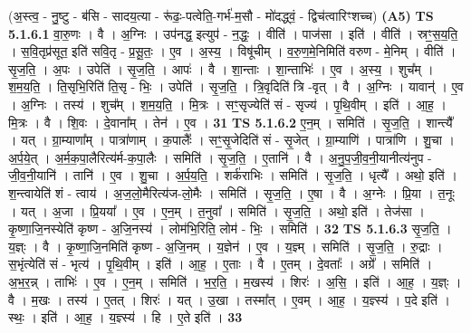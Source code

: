 \documentclass[17pt]{extarticle}
\begin{document}
                  \newline
                      (अ॒स्त्व॒ - नु॒ष्टु - ब॑सि - सादय॒त्या - रू॑ढः॒-पत्वेति॒-गर्भ॑-म॒सौ - मो॑दद्ध्वं॒ - द्विच॑त्वारिꣳशच्च)  \textbf{(A5)} \newline \newline
                                \textbf{ TS 5.1.6.1} \newline
                  वा॒रु॒णः । वै । अ॒ग्निः । उप॑नद्ध॒ इत्युप॑ - न॒द्धः॒ । वीति॑ । पाज॑सा । इति॑ । वीति॑ । स्रꣳ॒॒स॒य॒ति॒ । स॒वि॒तृप्र॑सूत॒ इति॑ सवि॒तृ - प्र॒सू॒तः॒ । ए॒व । अ॒स्य॒ । विषू॑चीम् । व॒रु॒ण॒मे॒निमिति॑ वरुण - मे॒निम् । वीति॑ । सृ॒ज॒ति॒ । अ॒पः । उपेति॑ । सृ॒ज॒ति॒ । आपः॑ । वै । शा॒न्ताः । शा॒न्ताभिः॑ । ए॒व । अ॒स्य॒ । शुच᳚म् । श॒म॒य॒ति॒ । ति॒सृभि॒रिति॑ ति॒सृ - भिः॒ । उपेति॑ । सृ॒ज॒ति॒ । त्रि॒वृदिति॑ त्रि -वृत् । वै । अ॒ग्निः । यावान्॑ । ए॒व । अ॒ग्निः । तस्य॑ । शुच᳚म् । श॒म॒य॒ति॒ । मि॒त्रः । सꣳ॒॒सृज्येति॑ सं - सृज्य॑ । पृ॒थि॒वीम् । इति॑ । आ॒ह॒ । मि॒त्रः । वै । शि॒वः । दे॒वाना᳚म् । तेन॑ । ए॒व । \textbf{  31} \newline
                  \newline
                                \textbf{ TS 5.1.6.2} \newline
                  ए॒न॒म् । समिति॑ । सृ॒ज॒ति॒ । शान्त्यै᳚ । यत् । ग्रा॒म्याणा᳚म् । पात्रा॑णाम् । क॒पालैः᳚ । सꣳ॒॒सृ॒जेदिति॑ सं - सृ॒जेत् । ग्रा॒म्याणि॑ । पात्रा॑णि । शु॒चा । अ॒र्प॒ये॒त् । अ॒र्म॒क॒पा॒लैरित्य॑र्म-क॒पा॒लैः । समिति॑ । सृ॒ज॒ति॒ । ए॒तानि॑ । वै । अ॒नु॒प॒जी॒व॒नी॒यानीत्य॑नुप - जी॒व॒नी॒यानि॑ । तानि॑ । ए॒व । शु॒चा । अ॒र्प॒य॒ति॒ । शर्क॑राभिः । समिति॑ । सृ॒ज॒ति॒ । धृत्यै᳚ । अथो॒ इति॑ । श॒न्त्वायेति॑ शं - त्वाय॑ । अ॒ज॒लो॒मैरित्य॑ज-लो॒मैः । समिति॑ । सृ॒ज॒ति॒ । ए॒षा । वै । अ॒ग्नेः । प्रि॒या । त॒नूः । यत् । अ॒जा । प्रि॒यया᳚ । ए॒व । ए॒न॒म् । त॒नुवा᳚ । समिति॑ । सृ॒ज॒ति॒ । अथो॒ इति॑ । तेज॑सा । कृ॒ष्णा॒जि॒नस्येति॑ कृष्ण - अ॒जि॒नस्य॑ । लोम॑भि॒रिति॒ लोम॑ - भिः॒ । समिति॑ । \textbf{  32} \newline
                  \newline
                                \textbf{ TS 5.1.6.3} \newline
                  सृ॒ज॒ति॒ । य॒ज्ञ्ः । वै । कृ॒ष्णा॒जि॒नमिति॑ कृष्ण - अ॒जि॒नम् । य॒ज्ञेन॑ । ए॒व । य॒ज्ञ्म् । समिति॑ । सृ॒ज॒ति॒ । रु॒द्राः । स॒भृंत्येति॑ सं - भृत्य॑ । पृ॒थि॒वीम् । इति॑ । आ॒ह॒ । ए॒ताः । वै । ए॒तम् । दे॒वताः᳚ । अग्रे᳚ । समिति॑ । अ॒भ॒र॒न्न् । ताभिः॑ । ए॒व । ए॒न॒म् । समिति॑ । भ॒र॒ति॒ । म॒खस्य॑ । शिरः॑ । अ॒सि॒ । इति॑ । आ॒ह॒ । य॒ज्ञ्ः । वै । म॒खः । तस्य॑ । ए॒तत् । शिरः॑ । यत् । उ॒खा । तस्मा᳚त् । ए॒वम् । आ॒ह॒ । य॒ज्ञ्स्य॑ । प॒दे इति॑ । स्थः॒ । इति॑ । आ॒ह॒ । य॒ज्ञ्स्य॑ । हि । ए॒ते इति॑ । \textbf{  33} \newline
\end{document}
